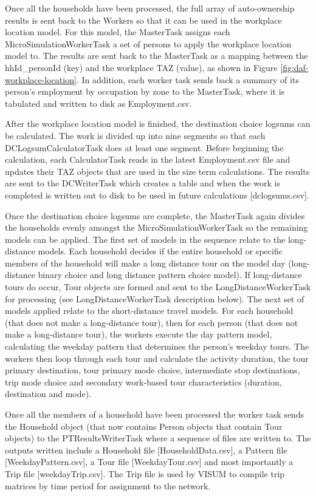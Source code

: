Once all the households have been processed, the full array of auto-ownership results is sent back to the Workers so that it can be used in the workplace location model. For this model, the MasterTask assigns each MicroSimulationWorkerTask a set of persons to apply the workplace location model to. The results are sent back to the MasterTask as a mapping between the hhId\_personId (key) and the workplace TAZ (value), as shown in Figure \ref{fig:daf-workplace-location}. In addition, each worker task sends back a summary of its person's employment by occupation by zone to the MasterTask, where it is tabulated and written to disk as Employment.csv. 

After the workplace location model is finished, the destination choice logsums can be calculated. The work is divided up into nine segments so that each DCLogsumCalculatorTask does at least one segment. Before beginning the calculation, each CalculatorTask reads in the latest Employment.csv file and updates their TAZ objects that are used in the size term calculations. The results are sent to the DCWriterTask which creates a table and when the work is completed is written out to disk to be used in future calculations [dclogsums.csv]. 

Once the destination choice logsums are complete, the MasterTask again divides the households evenly amongst the MicroSimulationWorkerTask so the remaining models can be applied. The first set of models in the sequence relate to the long-distance models. Each household decides if the entire household or specific members of the household will make a long distance tour on the model day (long-distance binary choice and long distance pattern choice model). If long-distance tours do occur, Tour objects are formed and sent to the LongDistanceWorkerTask for processing (see LongDistanceWorkerTask description below). The next set of models applied relate to the short-distance travel models. For each household (that does not make a long-distance tour), then for each person (that does not make a long-distance tour), the workers execute the day pattern model, calculating the weekday pattern that determines the person's weekday tours. The workers then loop through each tour and calculate the activity duration, the tour primary destination, tour primary mode choice, intermediate stop destinations, trip mode choice and secondary work-based tour characteristics (duration, destination and mode). 

Once all the members of a household have been processed the worker task sends the Household object (that now contains Person objects that contain Tour objects) to the PTResultsWriterTask where a sequence of files are written to. The outputs written include a Household file [HouseholdData.csv], a Pattern file [WeekdayPattern.csv], a Tour file [WeekdayTour.csv] and most importantly a Trip file [weekdayTrip.csv]. The Trip file is used by VISUM to compile trip matrices by time period for assignment to the network. 

